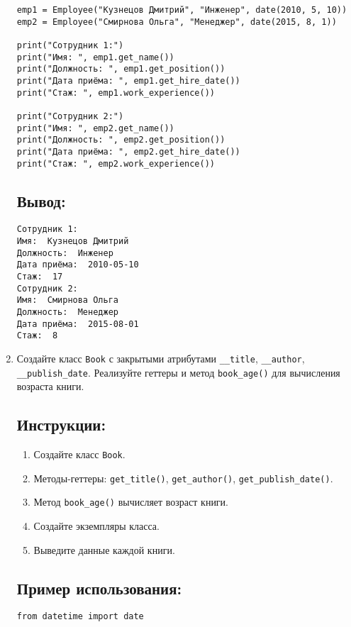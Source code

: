 \begin{enumerate}
\begin{lstlisting}[caption=Пример кода]
emp1 = Employee("Кузнецов Дмитрий", "Инженер", date(2010, 5, 10))
emp2 = Employee("Смирнова Ольга", "Менеджер", date(2015, 8, 1))

print("Сотрудник 1:")
print("Имя: ", emp1.get_name())
print("Должность: ", emp1.get_position())
print("Дата приёма: ", emp1.get_hire_date())
print("Стаж: ", emp1.work_experience())

print("Сотрудник 2:")
print("Имя: ", emp2.get_name())
print("Должность: ", emp2.get_position())
print("Дата приёма: ", emp2.get_hire_date())
print("Стаж: ", emp2.work_experience())
\end{lstlisting}

\subsection*{Вывод:}
\begin{lstlisting}[caption=Ожидаемый вывод]
Сотрудник 1:
Имя:  Кузнецов Дмитрий
Должность:  Инженер
Дата приёма:  2010-05-10
Стаж:  17
Сотрудник 2:
Имя:  Смирнова Ольга
Должность:  Менеджер
Дата приёма:  2015-08-01
Стаж:  8
\end{lstlisting}

\item
Создайте класс \texttt{Book} с закрытыми атрибутами \texttt{\_\_title}, \texttt{\_\_author}, \texttt{\_\_publish\_date}. Реализуйте геттеры и метод \texttt{book\_age()} для вычисления возраста книги.

\subsection*{Инструкции:}
\begin{enumerate}
    \item Создайте класс \texttt{Book}.
    \item Методы-геттеры: \texttt{get\_title()}, \texttt{get\_author()}, \texttt{get\_publish\_date()}.
    \item Метод \texttt{book\_age()} вычисляет возраст книги.
    \item Создайте экземпляры класса.
    \item Выведите данные каждой книги.
\end{enumerate}

\subsection*{Пример использования:}
\begin{lstlisting}[caption=Пример кода]
from datetime import date


\end{lstlisting}
\end{enumerate}
